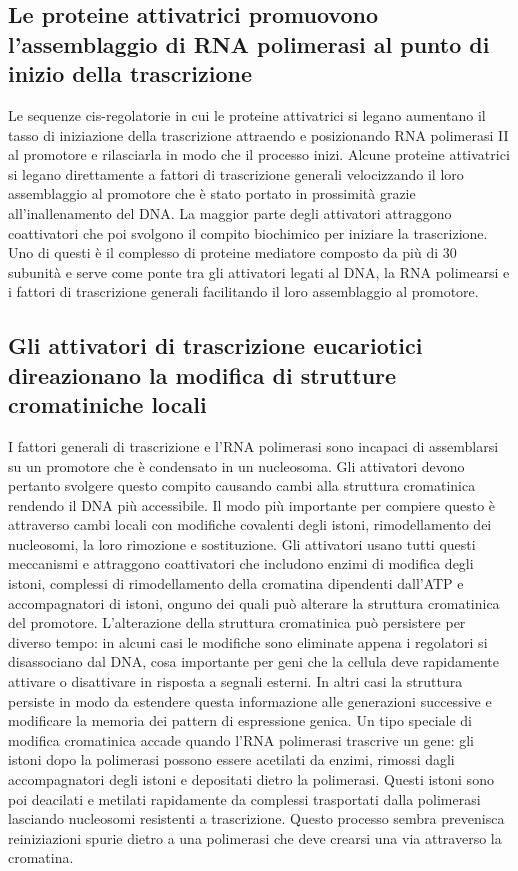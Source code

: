 \subsection{Le proteine attivatrici promuovono l'assemblaggio di RNA polimerasi al punto di inizio della trascrizione}
Le sequenze cis-regolatorie in cui le proteine attivatrici si legano aumentano il tasso di iniziazione della trascrizione attraendo e posizionando RNA polimerasi II al promotore e 
rilasciarla in modo che il processo inizi. Alcune proteine attivatrici si legano direttamente a fattori di trascrizione generali velocizzando il loro assemblaggio al promotore che \`e
stato portato in prossimit\`a grazie all'inallenamento del DNA. La maggior parte degli attivatori attraggono coattivatori che poi svolgono il compito biochimico per iniziare la 
trascrizione. Uno di questi \`e il complesso di proteine mediatore composto da pi\`u di $30$ subunit\`a e serve come ponte tra gli attivatori legati al DNA, la RNA polimearsi e i 
fattori di trascrizione generali facilitando il loro assemblaggio al promotore.
\subsection{Gli attivatori di trascrizione eucariotici direazionano la modifica di strutture cromatiniche locali}
I fattori generali di trascrizione e l'RNA polimerasi sono incapaci di assemblarsi su un promotore che \`e condensato in un nucleosoma. Gli attivatori devono pertanto svolgere questo 
compito causando cambi alla struttura cromatinica rendendo il DNA pi\`u accessibile. Il modo pi\`u importante per compiere questo \`e attraverso cambi locali con modifiche covalenti 
degli istoni, rimodellamento dei nucleosomi, la loro rimozione e sostituzione. Gli attivatori usano tutti questi meccanismi e attraggono coattivatori che includono enzimi di modifica 
degli istoni, complessi di rimodellamento della cromatina dipendenti dall'ATP e accompagnatori di istoni, onguno dei quali pu\`o alterare la struttura cromatinica del promotore. 
L'alterazione della struttura cromatinica pu\`o persistere per diverso tempo: in alcuni casi le modifiche sono eliminate appena i regolatori si disassociano dal DNA, cosa importante per
geni che la cellula deve rapidamente attivare o disattivare in risposta a segnali esterni. In altri casi la struttura persiste in modo da estendere questa informazione alle generazioni
successive e modificare la memoria dei pattern di espressione genica. Un tipo speciale di modifica cromatinica accade quando l'RNA polimerasi trascrive un gene: gli istoni dopo la 
polimerasi possono essere acetilati da enzimi, rimossi dagli accompagnatori degli istoni e depositati dietro la polimerasi. Questi istoni sono poi deacilati e metilati rapidamente da
complessi trasportati dalla polimerasi lasciando nucleosomi resistenti a trascrizione. Questo processo sembra prevenisca reiniziazioni spurie dietro a una polimerasi che deve crearsi
una via attraverso la cromatina.
